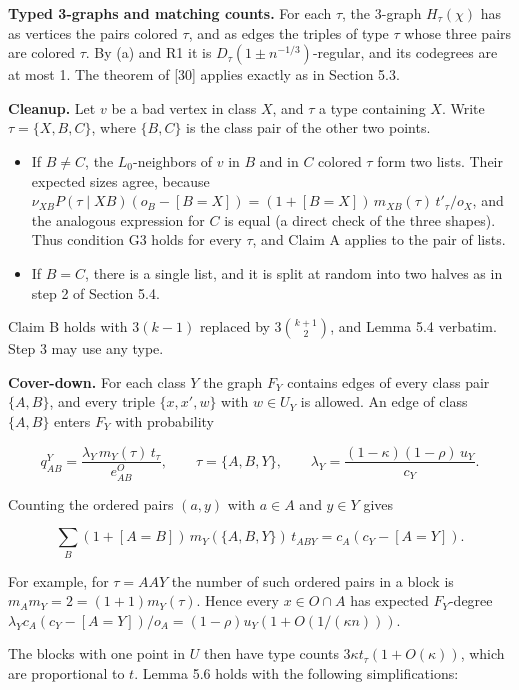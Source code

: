 \documentclass[english,11pt,a4paper]{article}
\providecommand{\tightlist}{\setlength{\itemsep}{0pt}\setlength{\parskip}{0pt}}
\begin{document}
\textbf{Typed 3-graphs and matching counts.} For each \(\tau\), the 3-graph \(H_\tau(\chi)\) has as vertices the pairs colored \(\tau\), and as edges the triples of type \(\tau\) whose three pairs are colored \(\tau\). By (a) and R1 it is \(D_\tau(1\pm n^{-1/3})\)-regular, and its codegrees are at most 1. The theorem of {[}30{]} applies exactly as in Section 5.3.

\textbf{Cleanup.} Let \(v\) be a bad vertex in class \(X\), and \(\tau\) a type containing \(X\). Write \(\tau=\{X,B,C\}\), where \(\{B,C\}\) is the class pair of the other two points.

\begin{itemize}
\tightlist
\item
  If \(B\ne C\), the \(L_0\)-neighbors of \(v\) in \(B\) and in \(C\) colored \(\tau\) form two lists. Their expected sizes agree, because \(\nu_{XB}P(\tau\mid XB)(o_B-[B=X])=(1+[B=X])\,m_{XB}(\tau)\,t'_\tau/o_X\), and the analogous expression for \(C\) is equal (a direct check of the three shapes). Thus condition G3 holds for every \(\tau\), and Claim A applies to the pair of lists.
\item
  If \(B=C\), there is a single list, and it is split at random into two halves as in step 2 of Section 5.4.
\end{itemize}

Claim B holds with \(3(k-1)\) replaced by \(3\binom{k+1}{2}\), and Lemma 5.4 verbatim. Step 3 may use any type.

\textbf{Cover-down.} For each class \(Y\) the graph \(F_Y\) contains edges of every class pair \(\{A,B\}\), and every triple \(\{x,x',w\}\) with \(w\in U_Y\) is allowed. An edge of class \(\{A,B\}\) enters \(F_Y\) with probability

\nopagebreak[4]
\[q^Y_{AB}=\frac{\lambda_Y\,m_Y(\tau)\,t_\tau}{e^O_{AB}},\qquad\tau=\{A,B,Y\},\qquad\lambda_Y=\frac{(1-\kappa)(1-\rho)\,u_Y}{c_Y}.\]

Counting the ordered pairs \((a,y)\) with \(a\in A\) and \(y\in Y\) gives

\nopagebreak[4]
\[\sum_B(1+[A=B])\,m_Y(\{A,B,Y\})\,t_{ABY}=c_A(c_Y-[A=Y]).\]

For example, for \(\tau=AAY\) the number of such ordered pairs in a block is \(m_Am_Y=2=(1+1)m_Y(\tau)\). Hence every \(x\in O\cap A\) has expected \(F_Y\)-degree \(\lambda_Yc_A(c_Y-[A=Y])/o_A=(1-\rho)u_Y(1+O(1/(\kappa n)))\).

The blocks with one point in \(U\) then have type counts \(3\kappa t_\tau(1+O(\kappa))\), which are proportional to \(t\). Lemma 5.6 holds with the following simplifications:
\end{document}
